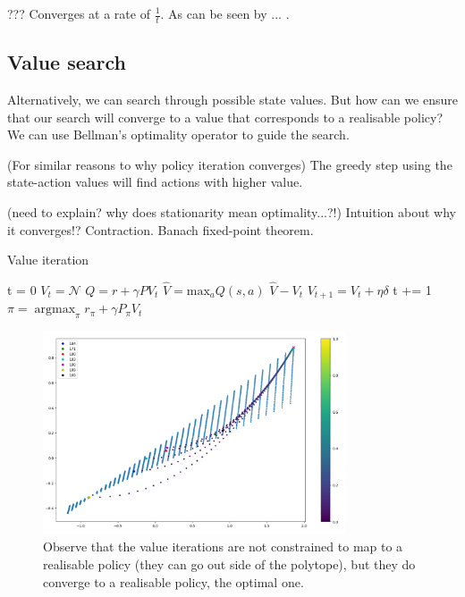 {\color{red}??? Converges at a rate of $\frac{1}{t}$. As can be seen by ...}
\cite{Agarwal2019a}.

\newpage

\subsection{Value search}

Alternatively, we can search through possible state values. But how can we ensure that our search will
converge to a value that corresponds to a realisable policy? We can use Bellman's
optimality operator to guide the search.

(For similar reasons to why policy iteration converges) The greedy step using the
state-action values will find actions with higher value.

{\color{red}(need to explain? why does stationarity mean optimality...?!)}
Intuition about why it converges!? Contraction. Banach fixed-point theorem.

\begin{algorithm}
\caption{Value iteration}
\begin{algorithmic}[1]

  \State t = 0
  \State $V_t = \mathcal N$ 
    \State $Q = r + \gamma PV_t$ 
    \State $\hat V = \text{max}_a Q(s, a)$  
    \State $\hat V - V_t$ 
    \State $V_{t+1} = V_t + \eta \delta$ 
    \State t += 1
  \EndWhile
  \State $\pi = \mathop{\text{argmax}}_{\pi} r_{\pi} + \gamma P_{\pi}V_t$
  \State \algorithmicreturn{ $\pi$}
\EndProcedure

\end{algorithmic}
\end{algorithm}

\begin{figure}[h!]
\centering
\includegraphics[width=0.8\textwidth,height=0.4\textheight]{../../pictures/figures/vi-polytope.png}
\caption{Observe that the value iterations are not constrained to map to a realisable policy
(they can go out side of the polytope), but they do converge to a realisable policy,
the optimal one.}
\end{figure}

